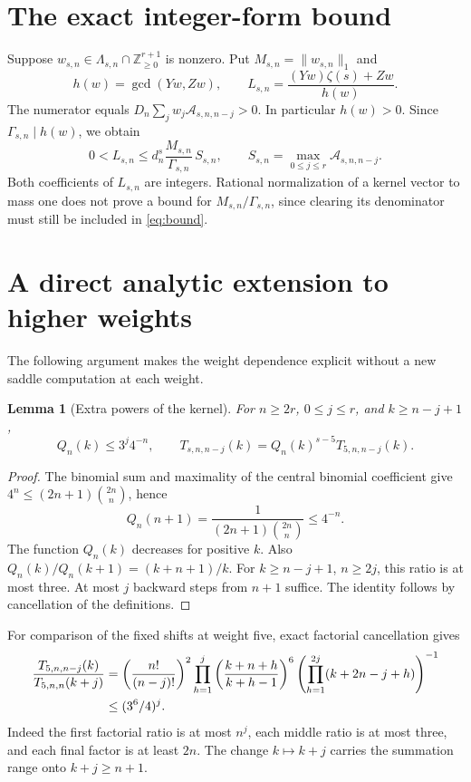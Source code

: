\documentclass[11pt]{article}
\newtheorem{lemma}[theorem]{Lemma}
\theoremstyle{remark}
\newcommand{\Z}{\mathbb Z}
\newcommand{\cA}{\mathcal A}
\begin{document}
\section{The exact integer-form bound}
\label{sec:integer-forms}
Suppose \(w_{s,n}\in\Lambda_{s,n}\cap\Z_{\ge0}^{r+1}\) is nonzero.
Put \(M_{s,n}=\|w_{s,n}\|_1\) and
\[
 h(w)=\gcd(Yw,Zw),\qquad
 L_{s,n}=\frac{(Yw)\zeta(s)+Zw}{h(w)}.
\]
The numerator equals \(D_n\sum_j w_j\cA_{s,n,n-j}>0\).
In particular \(h(w)>0\). Since \(\Gamma_{s,n}\mid h(w)\), we obtain
\begin{equation}
 0<L_{s,n}\le
 d_n^s\frac{M_{s,n}}{\Gamma_{s,n}}\,
 S_{s,n},\qquad
 S_{s,n}=\max_{0\le j\le r}\cA_{s,n,n-j}.
 \label{eq:bound}
\end{equation}
Both coefficients of \(L_{s,n}\) are integers.
Rational normalization of a kernel vector to mass one does not prove
a bound for \(M_{s,n}/\Gamma_{s,n}\), since clearing its denominator
must still be included in \eqref{eq:bound}.

\section{A direct analytic extension to higher weights}
\label{sec:higher-decay}
The following argument makes the weight dependence explicit without a
new saddle computation at each weight.

\begin{lemma}[Extra powers of the kernel]
For \(n\ge2r\), \(0\le j\le r\), and \(k\ge n-j+1\),
\[
 Q_n(k)\le3^j4^{-n},\qquad
 T_{s,n,n-j}(k)=Q_n(k)^{s-5}T_{5,n,n-j}(k).
\]
\end{lemma}
\begin{proof}
The binomial sum and maximality of the central binomial coefficient give
\(4^n\le(2n+1)\binom{2n}{n}\), hence
\[
 Q_n(n+1)=\frac{1}{(2n+1)\binom{2n}{n}}\le4^{-n}.
\]
The function \(Q_n(k)\) decreases for positive \(k\).
Also \(Q_n(k)/Q_n(k+1)=(k+n+1)/k\).
For \(k\ge n-j+1\), \(n\ge2j\), this ratio is at most three.
At most \(j\) backward steps from \(n+1\) suffice.
The identity follows by cancellation of the definitions.
\end{proof}

For comparison of the fixed shifts at weight five, exact factorial
cancellation gives
\begin{align}
 \frac{T_{5,n,n-j}(k)}{T_{5,n,n}(k+j)}
 &=
 \left(\frac{n!}{(n-j)!}\right)^2
 \prod_{h=1}^j\left(\frac{k+n+h}{k+h-1}\right)^6
 \left(\prod_{h=1}^{2j}(k+2n-j+h)\right)^{-1} \notag\\
 &\le (3^6/4)^j. \label{eq:shift}
\end{align}
Indeed the first factorial ratio is at most \(n^j\), each middle ratio
is at most three, and each final factor is at least \(2n\).
The change \(k\mapsto k+j\) carries the summation range onto \(k+j\ge n+1\).
\end{document}
